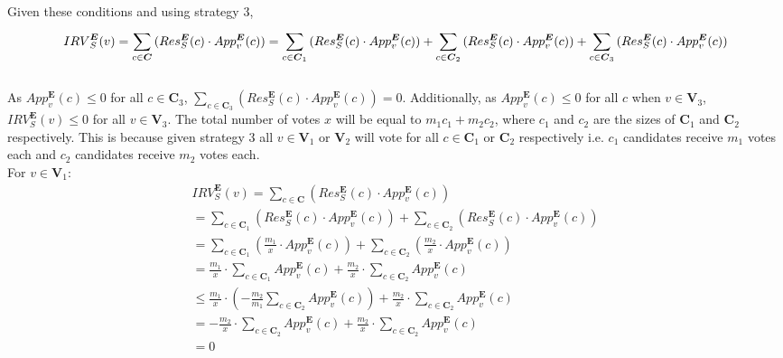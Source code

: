 \documentclass{article}
\begin{document}
Given these conditions and using strategy 3,
\begin{equation}
    {IRV}^{\boldsymbol{E}}_{S}(v) = \sum^{}_{c \in \boldsymbol{C}}{(Res^{\boldsymbol{E}}_{S}(c) \cdot App^{\boldsymbol{E}}_{v}(c))}\\
    = \sum^{}_{c \in \boldsymbol{C}_{1}}{(Res^{\boldsymbol{E}}_{S}(c) \cdot App^{\boldsymbol{E}}_{v}(c))}+\sum^{}_{c \in \boldsymbol{C}_{2}}{(Res^{\boldsymbol{E}}_{S}(c) \cdot App^{\boldsymbol{E}}_{v}(c))}+\sum^{}_{c \in \boldsymbol{C}_{3}}{(Res^{\boldsymbol{E}}_{S}(c) \cdot App^{\boldsymbol{E}}_{v}(c))}
\end{equation}\\

As $App^{\boldsymbol{E}}_{v}(c) \leq 0$ for all $c \in \boldsymbol{C}_{3}$, $\sum^{}_{c \in \boldsymbol{C}_{3}}{(Res^{\boldsymbol{E}}_{S}(c) \cdot App^{\boldsymbol{E}}_{v}(c))}=0$. 
Additionally, as $App^{\boldsymbol{E}}_{v}(c) \leq 0$ for all $c$ when $v \in \boldsymbol{V}_{3}$, ${IRV}^{\boldsymbol{E}}_{S}(v) \leq 0$ for all $v \in \boldsymbol{V}_{3}$. 
The total number of votes $x$ will be equal to ${m}_{1}{c}_{1}+{m}_{2}{c}_{2}$, where ${c}_{1}$ and ${c}_{2}$ are the sizes of $\boldsymbol{C}_{1}$ and $\boldsymbol{C}_{2}$ respectively. This is because given strategy 3 all $v \in \boldsymbol{V}_{1}$ or $\boldsymbol{V}_{2}$ will vote for all $c \in \boldsymbol{C}_{1}$ or $\boldsymbol{C}_{2}$ respectively i.e. ${c}_{1}$ candidates receive ${m}_{1}$ votes each and ${c}_{2}$ candidates receive ${m}_{2}$ votes each.\\
For $v \in \boldsymbol{V}_{1}$:
\begin{equation}
\begin{split}
    {IRV}^{\boldsymbol{E}}_{S}(v) = \sum^{}_{c \in \boldsymbol{C}}{(Res^{\boldsymbol{E}}_{S}(c) \cdot App^{\boldsymbol{E}}_{v}(c))}\\
    = \sum^{}_{c \in \boldsymbol{C}_{1}}{(Res^{\boldsymbol{E}}_{S}(c) \cdot App^{\boldsymbol{E}}_{v}(c))}+\sum^{}_{c \in \boldsymbol{C}_{2}}{(Res^{\boldsymbol{E}}_{S}(c) \cdot App^{\boldsymbol{E}}_{v}(c))}\\
    = \sum^{}_{c \in \boldsymbol{C}_{1}}{(\frac{{m}_{1}}{x} \cdot App^{\boldsymbol{E}}_{v}(c))}+\sum^{}_{c \in \boldsymbol{C}_{2}}{(\frac{{m}_{2}}{x} \cdot App^{\boldsymbol{E}}_{v}(c))}\\
    = \frac{{m}_{1}}{x} \cdot \sum^{}_{c \in \boldsymbol{C}_{1}}{App^{\boldsymbol{E}}_{v}(c)}+\frac{{m}_{2}}{x} \cdot \sum^{}_{c \in \boldsymbol{C}_{2}}{App^{\boldsymbol{E}}_{v}(c)}\\
    \leq \frac{{m}_{1}}{x} \cdot (-\frac{{m}_{2}}{{m}_{1}}\sum^{}_{c \in \boldsymbol{C}_{2}}{App^{\boldsymbol{E}}_{v}(c)})+\frac{{m}_{2}}{x} \cdot \sum^{}_{c \in \boldsymbol{C}_{2}}{App^{\boldsymbol{E}}_{v}(c)}\\
    = -\frac{{m}_{2}}{x} \cdot \sum^{}_{c \in \boldsymbol{C}_{2}}{App^{\boldsymbol{E}}_{v}(c)}+\frac{{m}_{2}}{x} \cdot \sum^{}_{c \in \boldsymbol{C}_{2}}{App^{\boldsymbol{E}}_{v}(c)}\\
    = 0
\end{split}     
\end{equation}\\
\end{document}
